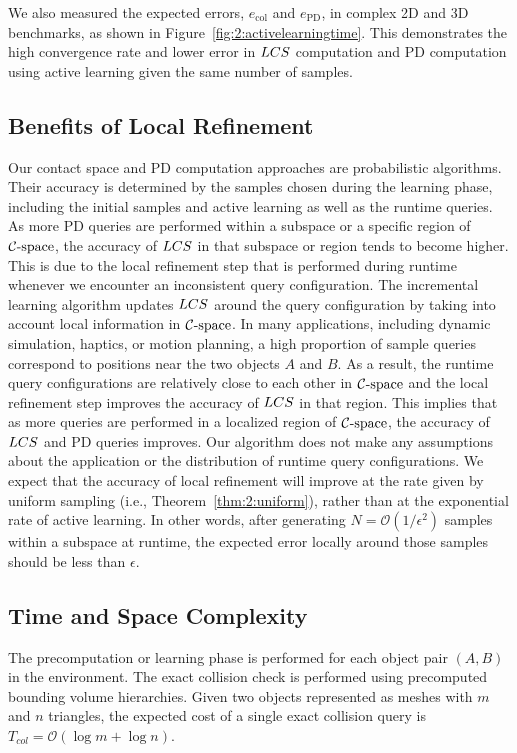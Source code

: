 We also measured the expected errors, $e_{\text{col}}$ and $e_{\text{PD}}$, in
complex 2D and 3D benchmarks, as shown in Figure~\ref{fig:2:activelearningtime}.
This demonstrates the high convergence rate and lower error in $LCS$ computation and PD computation using active learning given the same number
of samples.

\subsection{Benefits of Local Refinement}
Our contact space and PD computation approaches are probabilistic algorithms. Their accuracy is determined by
the samples chosen during the learning phase, including the initial samples and active learning as well as
the runtime queries. As more PD queries are performed within a subspace or a specific region of $\mathcal C\text{-space}$,
the accuracy of $LCS$ in that subspace or region tends to become higher.
This is due to the local refinement step that is performed during runtime whenever we encounter an
inconsistent query configuration.
The incremental learning algorithm updates $LCS$ around the query configuration by taking into account
local information in $\mathcal C\text{-space}$.
In many applications, including dynamic simulation, haptics, or motion planning, a high proportion of
sample queries correspond to positions near the two objects $A$ and $B$. As a result, the runtime
query configurations are relatively close to each other in $\mathcal C\text{-space}$ and the local refinement
step improves the accuracy of $LCS$ in that region. This implies that as more queries are performed in
a localized region of $\mathcal C\text{-space}$, the accuracy of $LCS$ and PD queries improves.
Our algorithm does not make any assumptions about the application or the distribution of runtime query
configurations. We expect that the accuracy of local refinement will improve at the rate given by
uniform sampling (i.e., Theorem~\ref{thm:2:uniform}), rather than at the exponential rate of active learning.
In other words, after generating $N = \mathcal O(1/\epsilon^2)$ samples within a subspace at runtime,
the expected error locally around those samples should be less than $\epsilon$.


\subsection{Time and Space Complexity}
\label{sec:2:analysis:timespacecomplexity}
The precomputation or learning phase is performed for each object pair $(A, B)$
in the environment. The exact collision check is performed using precomputed bounding volume hierarchies.
Given two objects represented as meshes with $m$ and $n$ triangles, the expected cost of a single
exact collision query is $T_{col} = \mathcal O(\log m + \log n)$.

